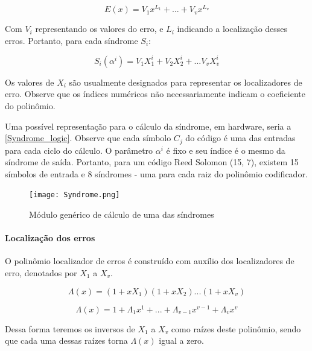 	\begin{equation}
	E(x) = V_{1}x^{L_{1}} + ... + V_{v}x^{L_{v}}
	\end{equation}

	Com $V_{i}$ representando os valores do erro, e $L_{i}$ indicando a localização desses erros. Portanto, para cada síndrome $S_{i}$:

	\begin{equation}
	S_{i}(\alpha^{i}) = V_{1}X_{1}^{i} + V_{2}X_{2}^{i} + ... V_{v}X_{v}^{i}
	\end{equation}

	Os valores de $X_{i}$ são usualmente designados para representar os localizadores de erro. Observe que os índices numéricos não necessariamente indicam o coeficiente do polinômio.

	Uma possível representação para o cálculo da síndrome, em hardware, seria a \autoref{Syndrome_logic}. Observe que cada símbolo $C_{j}$ do código é uma das entradas para cada ciclo do cálculo. O parâmetro $\alpha^{i}$ é fixo e seu índice é o mesmo da síndrome de saída. Portanto, para um código Reed Solomon (15, 7), existem 15 símbolos de entrada e 8 síndromes - uma para cada raiz do polinômio codificador.

	\begin{figure}[!htb]
		\caption{\label{Syndrome_logic} Módulo genérico de cálculo de uma das síndromes}
		\centering
		\texttt{[image: Syndrome.png]}
	\end{figure}

	\paragraph{Localização dos erros}

	O polinômio localizador de erros é construído com auxílio dos localizadores de erro, denotados por $X_{1}$ a $X_{v}$.

	\begin{equation}
	\Lambda(x) = (1 + xX_{1})(1 + xX_{2})...(1 + xX_{v})
	\end{equation}

	\begin{equation}
	\Lambda(x) =  1 + \Lambda_{1}x^{1} + ... + \Lambda_{v-1}x^{v-1} + \Lambda_{v}x^{v}
	\end{equation}

	Dessa forma teremos os inversos de $X_{1}$ a $X_{v}$ como raízes deste polinômio, sendo que cada uma dessas raízes torna $\Lambda(x)$ igual a zero.

